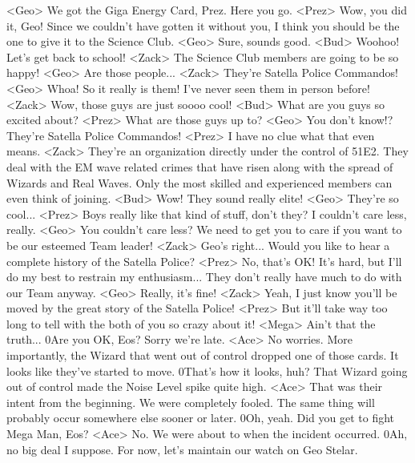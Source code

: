 <Geo> We got the Giga Energy Card, Prez. Here you go. 
<Prez> Wow, you did it, Geo! 
Since we couldn't have gotten it without you, I 
think you should be the one to give it to the Science Club. 
<Geo> Sure, sounds good. 
<Bud> Woohoo! Let's get back to school! 
<Zack> The Science Club members are going to be so happy! 
<Geo> Are those people... 
<Zack> They're Satella Police Commandos! 
<Geo> Whoa! So it really is them! 
I've never seen them in person before! 
<Zack> Wow, those guys are just soooo cool! 
<Bud> What are you guys so excited about? 
<Prez> What are those guys up to? 
<Geo> You don't know!? They're Satella Police Commandos! 
<Prez> I have no clue what that even means. 
<Zack> They're an organization directly under the control of {51}{E2}. 
They deal with the EM wave related crimes that 
have risen along with the spread of Wizards and Real Waves. 
Only the most skilled and experienced members can even think of joining. 
<Bud> Wow! They sound really elite! 
<Geo> They're so cool... 
<Prez> Boys really like that kind of stuff, don't they? I couldn't care less, really. 
<Geo> You couldn't care less? 
We need to get you to care if you want to be our esteemed Team leader! 
<Zack> Geo's right... 
Would you like to hear a complete history of the Satella Police? 
<Prez> No, that's OK! 
It's hard, but I'll do my best to restrain my enthusiasm... 
They don't really have much to do with our Team anyway. 
<Geo> Really, it's fine! 
<Zack> Yeah, I just know you'll be moved by the great story of the Satella Police! 
<Prez> But it'll take way too long to tell with the both of you so crazy about it! 
<Mega> Ain't that the truth... 
0Are you OK, Eos? Sorry we're late. 
<Ace> No worries. 
More importantly, the Wizard that went out of control 
dropped one of those cards. It looks like they've started to move. 
0That's how it looks, huh? 
That Wizard going out of control made the Noise Level spike quite high. 
<Ace> That was their intent from the beginning. We were completely fooled. 
The same thing will probably occur somewhere else sooner or later. 
0Oh, yeah. Did you get to fight Mega Man, Eos? 
<Ace> No. We were about to when the incident occurred. 
0Ah, no big deal I suppose. 
For now, let's maintain our watch on Geo Stelar. 

